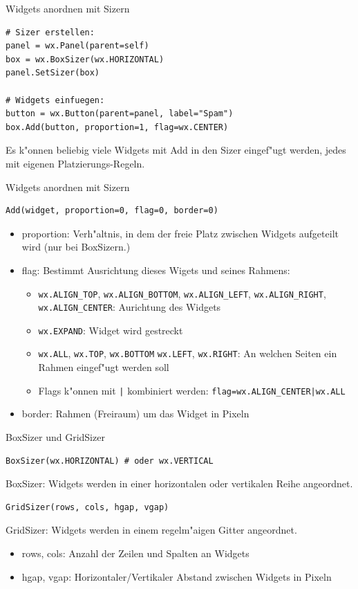 \begin{frame}[fragile]{Widgets anordnen mit Sizern}
\begin{lstlisting}[syle=Python]
# Sizer erstellen:
panel = wx.Panel(parent=self)
box = wx.BoxSizer(wx.HORIZONTAL)
panel.SetSizer(box)

# Widgets einfuegen:
button = wx.Button(parent=panel, label="Spam")
box.Add(button, proportion=1, flag=wx.CENTER)
\end{lstlisting}
Es k"onnen beliebig viele Widgets mit \alert{Add} in den Sizer eingef"ugt werden, jedes mit eigenen Platzierungs-Regeln.
\end{frame}


\begin{frame}[fragile]{Widgets anordnen mit Sizern}
\begin{lstlisting}[style=Python]
Add(widget, proportion=0, flag=0, border=0)
\end{lstlisting}
\begin{itemize}
\item \alert{proportion}: Verh"altnis, in dem der freie Platz zwischen Widgets aufgeteilt wird (nur bei BoxSizern.)
\item \alert{flag}: Bestimmt Ausrichtung dieses Wigets und seines Rahmens:
  \begin{itemize}
    \item \lstinline{wx.ALIGN_TOP}, \lstinline{wx.ALIGN_BOTTOM}, \lstinline{wx.ALIGN_LEFT}, \lstinline{wx.ALIGN_RIGHT}, \lstinline{wx.ALIGN_CENTER}: Aurichtung des Widgets
    \item \lstinline{wx.EXPAND}: Widget wird gestreckt
    \item \lstinline{wx.ALL}, \lstinline{wx.TOP}, \lstinline{wx.BOTTOM} \lstinline{wx.LEFT}, \lstinline{wx.RIGHT}: An welchen Seiten ein Rahmen eingef"ugt werden soll
    \item Flags k"onnen mit \lstinline{|} kombiniert werden: \lstinline{flag=wx.ALIGN_CENTER|wx.ALL}
  \end{itemize}
\item \alert{border}: Rahmen (Freiraum) um das Widget in Pixeln
\end{itemize}
\end{frame}

\begin{frame}[fragile]{BoxSizer und GridSizer}
\begin{lstlisting}[style=Python]
BoxSizer(wx.HORIZONTAL) # oder wx.VERTICAL
\end{lstlisting}
\alert{BoxSizer}: Widgets werden in einer horizontalen oder vertikalen Reihe angeordnet.\\[3mm]
\begin{lstlisting}[style=Python]
GridSizer(rows, cols, hgap, vgap)
\end{lstlisting}
\alert{GridSizer}: Widgets werden in einem regelm"a\3igen Gitter angeordnet.
\begin{itemize}
\item \alert{rows}, \alert{cols}: Anzahl der Zeilen und Spalten an Widgets
\item \alert{hgap}, \alert{vgap}: Horizontaler/Vertikaler Abstand zwischen Widgets in Pixeln
\end{itemize}
\end{frame}


